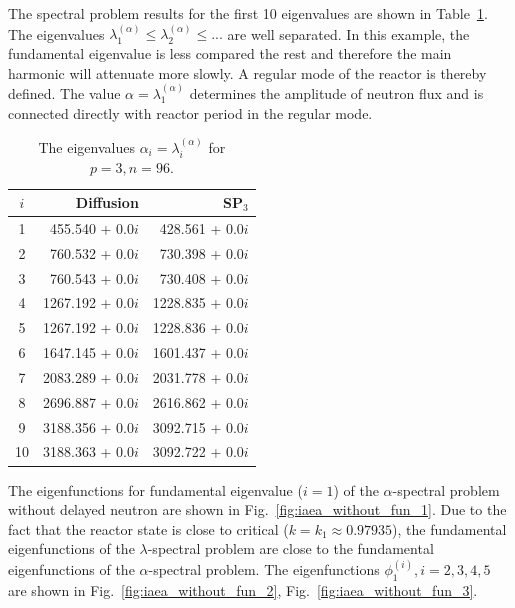 \documentclass[authoryear]{elsarticle}
\begin{document}
The spectral problem results for the first 10 eigenvalues are shown in Table~\ref{tab:iaea_without_alpha_10}.
The eigenvalues $\lambda_1^{(\alpha)} \leq \lambda_2^{(\alpha)} \leq ...$ are well separated. 
In this example, the fundamental eigenvalue is less compared the rest and therefore the main harmonic  will attenuate more slowly.
A regular mode of the reactor is thereby defined.
The value $\alpha = \lambda_1^{(\alpha)}$ determines the amplitude of neutron flux and is connected directly with reactor period in the regular mode.

\begin{table}[h]
\caption{The eigenvalues $\alpha_i=\lambda_i^{(\alpha)}$ for $p=3, n=96$.}
\label{tab:iaea_without_alpha_10}
\begin{center}
\begin{tabular}{c r r}
\hline
$i$ & Diffusion & SP$_3$ \\
\hline
1 & 455.540 + 0.0$i$& 428.561 + 0.0$i$ \\
2 & 760.532 + 0.0$i$& 730.398 + 0.0$i$ \\
3 & 760.543 + 0.0$i$& 730.408 + 0.0$i$ \\
4 & 1267.192 + 0.0$i$&1228.835 + 0.0$i$ \\
5 & 1267.192 + 0.0$i$&1228.836 + 0.0$i$ \\
6 & 1647.145 + 0.0$i$&1601.437 + 0.0$i$ \\
7 & 2083.289 + 0.0$i$&2031.778 + 0.0$i$ \\
8 & 2696.887 + 0.0$i$&2616.862 + 0.0$i$ \\
9 & 3188.356 + 0.0$i$&3092.715 + 0.0$i$ \\
10& 3188.363 + 0.0$i$&3092.722 + 0.0$i$ \\
\hline
\end{tabular}
\end{center}
\end{table}

The eigenfunctions for fundamental eigenvalue ($i=1$) of the $\alpha$-spectral problem without delayed neutron are shown in Fig.~\ref{fig:iaea_without_fun_1}. 
Due to the fact that the reactor state is close to critical ($k=k_1\approx 0.97935$), the fundamental eigenfunctions of the $\lambda$-spectral problem are close to the fundamental eigenfunctions of the $\alpha$-spectral problem.
The eigenfunctions $\phi_1^{(i)}, i=2,3,4,5$ are shown in Fig.~\ref{fig:iaea_without_fun_2}, Fig.~\ref{fig:iaea_without_fun_3}.
\end{document}

